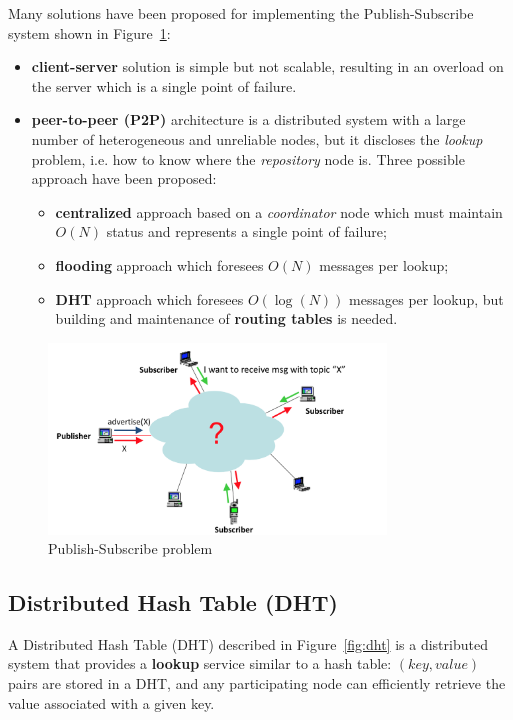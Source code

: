 \documentclass[a4paper,12pt]{article}
\begin{document}
Many solutions have been proposed for implementing the Publish-Subscribe system shown in Figure~\ref{fig:ps-problem}:
\begin{itemize}
  \item \textbf{client-server} solution is simple but not scalable, resulting in an overload on the server which is a single point of failure.
  \item \textbf{peer-to-peer (P2P)} architecture is a distributed system with a large number of heterogeneous and unreliable nodes, but it discloses the \textit{lookup} problem, i.e. how to know where the \textit{repository} node is. Three possible approach have been proposed:
  \begin{itemize}
    \item \textbf{centralized} approach based on a \textit{coordinator} node which must maintain $O(N)$ status and represents a single point of failure;
    \item \textbf{flooding} approach which foresees $O(N)$ messages per lookup;
    \item \textbf{DHT} approach which foresees $O(\log(N))$ messages per lookup, but building and maintenance of \textbf{routing tables} is needed.
  \end{itemize}
\end{itemize}

\begin{figure}[b!]
  \centering
  \includegraphics[width=0.8\textwidth]{img/ps-problem}
  \caption{\label{fig:ps-problem} Publish-Subscribe problem}
\end{figure}


\subsection{Distributed Hash Table (DHT)}
A Distributed Hash Table (DHT) described in Figure~\ref{fig:dht} is a distributed system that provides a \textbf{lookup} service similar to a hash table: $(key, value)$ pairs are stored in a DHT, and any participating node can efficiently retrieve the value associated with a given key.
\end{document}
